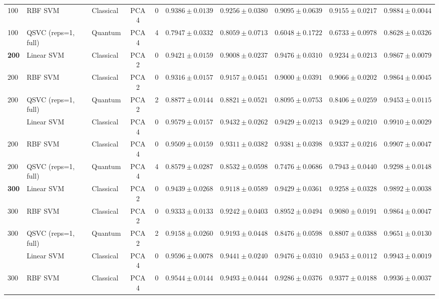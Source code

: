 \documentclass[12pt,a4paper]{article}
\begin{document}
\begin{landscape}
\begin{table}[p]
{\begin{tabular}{lllccccccc}
100 & RBF SVM & Classical & PCA 4 & 0 & $0.9386 \pm 0.0139$ & $0.9256 \pm 0.0380$ & $0.9095 \pm 0.0639$ & $0.9155 \pm 0.0217$ & $0.9884 \pm 0.0044$ \\
100 & QSVC (reps=1, full) & Quantum & PCA 4 & 4 & $0.7947 \pm 0.0332$ & $0.8059 \pm 0.0713$ & $0.6048 \pm 0.1722$ & $\mathbf{0.6733 \pm 0.0978}$ & $0.8628 \pm 0.0326$ \\
\midrule
\textbf{200} & Linear SVM & Classical & PCA 2 & 0 & $0.9421 \pm 0.0159$ & $0.9008 \pm 0.0237$ & $0.9476 \pm 0.0310$ & $\mathbf{0.9234 \pm 0.0213}$ & $0.9867 \pm 0.0079$ \\
200 & RBF SVM & Classical & PCA 2 & 0 & $0.9316 \pm 0.0157$ & $0.9157 \pm 0.0451$ & $0.9000 \pm 0.0391$ & $0.9066 \pm 0.0202$ & $0.9864 \pm 0.0045$ \\
200 & QSVC (reps=1, full) & Quantum & PCA 2 & 2 & $0.8877 \pm 0.0144$ & $0.8821 \pm 0.0521$ & $0.8095 \pm 0.0753$ & $\mathbf{0.8406 \pm 0.0259}$ & $0.9453 \pm 0.0115$ \\
\addlinespace
200 & Linear SVM & Classical & PCA 4 & 0 & $0.9579 \pm 0.0157$ & $0.9432 \pm 0.0262$ & $0.9429 \pm 0.0213$ & $\mathbf{0.9429 \pm 0.0210}$ & $0.9910 \pm 0.0029$ \\
200 & RBF SVM & Classical & PCA 4 & 0 & $0.9509 \pm 0.0159$ & $0.9311 \pm 0.0382$ & $0.9381 \pm 0.0398$ & $0.9337 \pm 0.0216$ & $0.9907 \pm 0.0047$ \\
200 & QSVC (reps=1, full) & Quantum & PCA 4 & 4 & $0.8579 \pm 0.0287$ & $0.8532 \pm 0.0598$ & $0.7476 \pm 0.0686$ & $\mathbf{0.7943 \pm 0.0440}$ & $0.9298 \pm 0.0148$ \\
\midrule
\textbf{300} & Linear SVM & Classical & PCA 2 & 0 & $0.9439 \pm 0.0268$ & $0.9118 \pm 0.0589$ & $0.9429 \pm 0.0361$ & $\mathbf{0.9258 \pm 0.0328}$ & $0.9892 \pm 0.0038$ \\
300 & RBF SVM & Classical & PCA 2 & 0 & $0.9333 \pm 0.0133$ & $0.9242 \pm 0.0403$ & $0.8952 \pm 0.0494$ & $0.9080 \pm 0.0191$ & $0.9864 \pm 0.0047$ \\
300 & QSVC (reps=1, full) & Quantum & PCA 2 & 2 & $0.9158 \pm 0.0260$ & $0.9193 \pm 0.0448$ & $0.8476 \pm 0.0598$ & $\mathbf{0.8807 \pm 0.0388}$ & $0.9651 \pm 0.0130$ \\
\addlinespace
300 & Linear SVM & Classical & PCA 4 & 0 & $0.9596 \pm 0.0078$ & $0.9441 \pm 0.0240$ & $0.9476 \pm 0.0310$ & $\mathbf{0.9453 \pm 0.0112}$ & $0.9943 \pm 0.0019$ \\
300 & RBF SVM & Classical & PCA 4 & 0 & $0.9544 \pm 0.0144$ & $0.9493 \pm 0.0444$ & $0.9286 \pm 0.0376$ & $0.9377 \pm 0.0188$ & $0.9936 \pm 0.0037$ \\

\end{tabular}}
\end{table}
\end{landscape}
\end{document}
